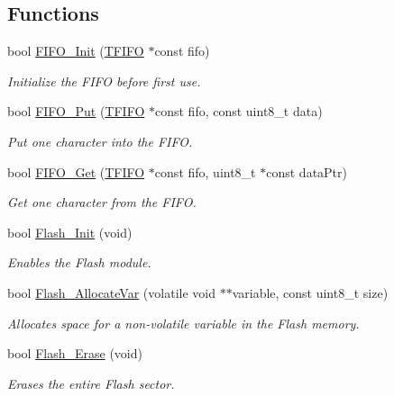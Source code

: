 \subsection*{Functions}
\begin{DoxyCompactItemize}
\item 
bool \hyperlink{group__main__module_ga115b9933e65901622b3593e422a96c2f}{F\+I\+F\+O\+\_\+\+Init} (\hyperlink{struct_t_f_i_f_o}{T\+F\+I\+F\+O} $\ast$const fifo)
\begin{DoxyCompactList}\small\item\em Initialize the F\+I\+F\+O before first use. \end{DoxyCompactList}\item 
bool \hyperlink{group__main__module_gae4cdc6c11a6968c29c591b6edb4a9b04}{F\+I\+F\+O\+\_\+\+Put} (\hyperlink{struct_t_f_i_f_o}{T\+F\+I\+F\+O} $\ast$const fifo, const uint8\+\_\+t data)
\begin{DoxyCompactList}\small\item\em Put one character into the F\+I\+F\+O. \end{DoxyCompactList}\item 
bool \hyperlink{group__main__module_ga166b7485fe03e741d3a9dae3d908e5db}{F\+I\+F\+O\+\_\+\+Get} (\hyperlink{struct_t_f_i_f_o}{T\+F\+I\+F\+O} $\ast$const fifo, uint8\+\_\+t $\ast$const data\+Ptr)
\begin{DoxyCompactList}\small\item\em Get one character from the F\+I\+F\+O. \end{DoxyCompactList}\item 
bool \hyperlink{group__main__module_gaa5782279b5e558cafc2f135c0a1177d3}{Flash\+\_\+\+Init} (void)
\begin{DoxyCompactList}\small\item\em Enables the Flash module. \end{DoxyCompactList}\item 
bool \hyperlink{group__main__module_ga50871aff0f5af1e092aea3ed2545cf72}{Flash\+\_\+\+Allocate\+Var} (volatile void $\ast$$\ast$variable, const uint8\+\_\+t size)
\begin{DoxyCompactList}\small\item\em Allocates space for a non-\/volatile variable in the Flash memory. \end{DoxyCompactList}\item 
bool \hyperlink{group__main__module_ga06868787ccef73e69bd236d3b93b68f3}{Flash\+\_\+\+Erase} (void)
\begin{DoxyCompactList}\small\item\em Erases the entire Flash sector. \end{DoxyCompactList}\item 
$$
\end{DoxyCompactItemize}
